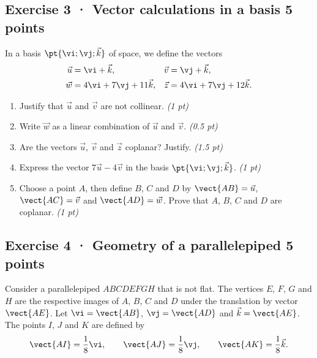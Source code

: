 \mxnewpage{}

\subsection*{Exercise 3 · Vector calculations in a basis \hfill 5 points}In a basis $\pt{\vi;\vj;\vec k}$ of space, we define the vectors
\[\begin{aligned}\vec u&=\vi+\vec k,&\vec v&=\vj+\vec k,\\
\vec w&=4\vi+7\vj+11\vec k,&\vec z&=4\vi+7\vj+12\vec k.\end{aligned}\]

\begin{enumerate}

\item Justify that $\vec u$ and $\vec v$ are not collinear. \hfill\textit{(1 pt)}

\item Write $\vec w$ as a linear combination of $\vec u$ and $\vec v$. \hfill\textit{(0.5 pt)}

\item Are the vectors $\vec u$, $\vec v$ and $\vec z$ coplanar? Justify. \hfill\textit{(1.5 pt)}

\item Express the vector $7\vec u-4\vec v$ in the basis $\pt{\vi;\vj;\vec k}$. \hfill\textit{(1 pt)}

\item Choose a point $A$, then define $B$, $C$ and $D$ by $\vect{AB}=\vec u$, $\vect{AC}=\vec v$ and $\vect{AD}=\vec w$. Prove that $A$, $B$, $C$ and $D$ are coplanar. \hfill\textit{(1 pt)}

\end{enumerate}

\subsection*{Exercise 4 · Geometry of a parallelepiped \hfill 5 points}Consider a parallelepiped $ABCDEFGH$ that is not flat. The vertices $E$, $F$, $G$ and $H$ are the respective images of $A$, $B$, $C$ and $D$ under the translation by vector $\vect{AE}$.
Let $\vi=\vect{AB}$, $\vj=\vect{AD}$ and $\vec k=\vect{AE}$.
The points $I$, $J$ and $K$ are defined by
\[\vect{AI}=\frac1{8}\vi,\qquad\vect{AJ}=\frac1{8}\vj,\qquad\vect{AK}=\frac1{8}\vec k.\]

